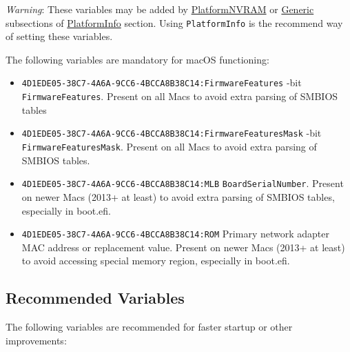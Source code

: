 \documentclass[]{article}
\makeatletter
\providecommand{\tightlist}{%
  \setlength{\itemsep}{0pt}\setlength{\parskip}{0pt}}
\renewcommand{\label}[1]{%
\zref@wrapper@immediate{\oldlabel{#1}}}  %
\makeatother
\begin{document}
\emph{Warning}: These variables may be added by
\hyperref[platforminfonvram]{PlatformNVRAM} or
\hyperref[platforminfogeneric]{Generic} subsections of
\hyperref[platforminfo]{PlatformInfo} section.
Using \texttt{PlatformInfo} is the recommend way of setting these variables.

The following variables are mandatory for macOS functioning:

\begin{itemize}
\tightlist
\item
  \texttt{4D1EDE05-38C7-4A6A-9CC6-4BCCA8B38C14:FirmwareFeatures}
  -bit \texttt{FirmwareFeatures}. Present on all Macs to avoid extra parsing of SMBIOS tables
\item
  \texttt{4D1EDE05-38C7-4A6A-9CC6-4BCCA8B38C14:FirmwareFeaturesMask}
  -bit \texttt{FirmwareFeaturesMask}. Present on all Macs to avoid extra parsing
  of SMBIOS tables.
\item
  \texttt{4D1EDE05-38C7-4A6A-9CC6-4BCCA8B38C14:MLB}
  \break
  \texttt{BoardSerialNumber}. Present on newer Macs (2013+ at least) to avoid extra parsing
  of SMBIOS tables, especially in boot.efi.
\item
  \texttt{4D1EDE05-38C7-4A6A-9CC6-4BCCA8B38C14:ROM}
  \break
  Primary network adapter MAC address or replacement value. Present on newer Macs
  (2013+ at least) to avoid accessing special memory region, especially in boot.efi.
\end{itemize}

\subsection{Recommended Variables}\label{nvramvarsrec}

The following variables are recommended for faster startup or other
improvements:
\end{document}
